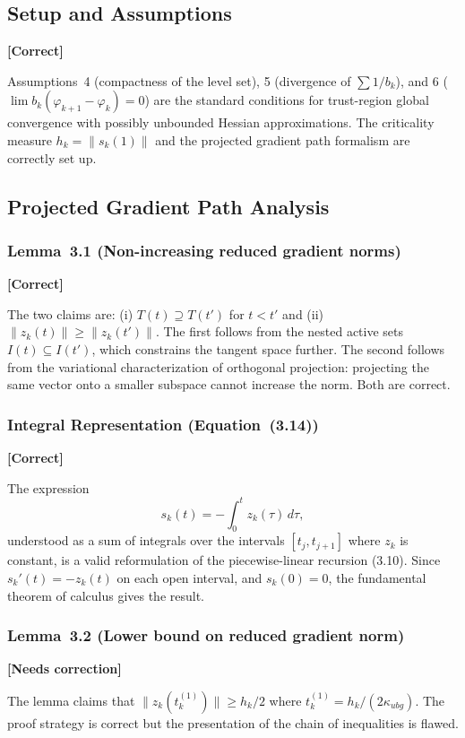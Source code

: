 \documentclass[11pt]{article}
\newcommand{\statusok}{\textcolor{okcolor}{\textbf{[Correct]}}}
\newcommand{\statuserr}{\textcolor{issuecolor}{\textbf{[Needs correction]}}}
\theoremstyle{plain}
\begin{document}
\subsection{Setup and Assumptions}
\statusok

Assumptions~4 (compactness of the level set), 5 (divergence of $\sum 1/b_k$), and 6 ($\lim b_k(\varphi_{k+1} - \varphi_k) = 0$) are the standard conditions for trust-region global convergence with possibly unbounded Hessian approximations. The criticality measure $h_k = \|s_k(1)\|$ and the projected gradient path formalism are correctly set up.

\subsection{Projected Gradient Path Analysis}

\subsubsection{Lemma~3.1 (Non-increasing reduced gradient norms)}
\statusok

The two claims are: (i) $T(t) \supseteq T(t')$ for $t < t'$ and (ii) $\|z_k(t)\| \ge \|z_k(t')\|$. The first follows from the nested active sets $I(t) \subseteq I(t')$, which constrains the tangent space further. The second follows from the variational characterization of orthogonal projection: projecting the same vector onto a smaller subspace cannot increase the norm. Both are correct.

\subsubsection{Integral Representation (Equation~(3.14))}
\statusok

The expression
\[
s_k(t) = -\int_0^t z_k(\tau)\,d\tau,
\]
understood as a sum of integrals over the intervals $[t_j,t_{j+1}]$ where $z_k$ is constant, is a valid reformulation of the piecewise-linear recursion (3.10). Since $s_k'(t) = -z_k(t)$ on each open interval, and $s_k(0) = 0$, the fundamental theorem of calculus gives the result.

\subsubsection{Lemma~3.2 (Lower bound on reduced gradient norm)}
\statuserr

The lemma claims that $\|z_k(t_k^{(1)})\| \ge h_k/2$ where $t_k^{(1)} = h_k/(2\kappa_{ubg})$. The proof strategy is correct but the presentation of the chain of inequalities is flawed.
\end{document}
